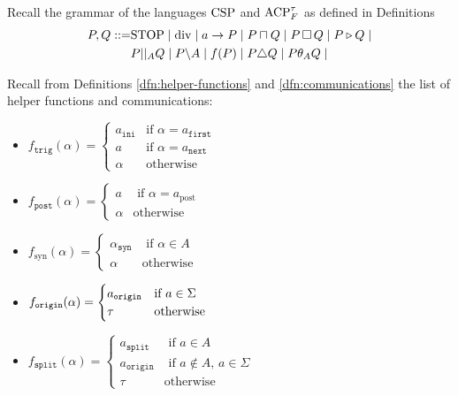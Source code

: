 \documentclass[../hons_project.tex]{subfiles}
\begin{document}
Recall the grammar of the languages $\mathrm{CSP}$ and $\mathrm{ACP}_{F}^{\tau}$ as defined in Definitions
\begin{align*}
	P, Q ::= & \mathrm{STOP} \mid \mathrm{div} \mid a\to P \mid P \sqcap Q \mid P \,\square\, Q \mid P \triangleright Q \mid \\
	         & P | |_{A} Q \mid P \backslash A \mid f(P) \mid P \triangle Q \mid P \theta_{A} Q \mid
\end{align*}

\vspace{-10pt}
Recall from Definitions \ref{dfn:helper-functions} and \ref{dfn:communications} the list of helper functions and communications:

\begin{multicols}{2}
	\begin{itemize}[leftmargin=*]
		\item $f_{\mathtt{trig}}(\alpha) = \begin{cases}
				      a_{\mathtt{ini}} & \text{if } \alpha = a_{\mathtt{first}} \\
				      a                & \text{if } \alpha = a_{\mathtt{next}}  \\
				      \alpha           & \text{otherwise}
			      \end{cases}$

		\item $f_{\mathtt{post}}(\alpha) = \begin{cases}
				      a      & \text{ if } \alpha = a_{\mathrm{post}} \\
				      \alpha & \text{otherwise}
			      \end{cases}$

		\item $f_{\mathrm{syn}}(\alpha) = \begin{cases}
				      \alpha_{\mathtt{syn}} & \text{ if } \alpha\in A \\
				      \alpha                & \text{otherwise}
			      \end{cases}$

		\item $f_{\mathtt{origin}}(\alpha) = \begin{cases}
				      a_{\mathtt{origin}} & \text{if } a\in\Sigma \\
				      \tau                & \text{otherwise}
			      \end{cases}$
		\item $f_{\mathtt{split}}(\alpha) = \begin{cases}
				      a_{\mathtt{split}}  & \text{ if } a\in A                    \\
				      a_{\mathtt{origin}} & \text{ if } a\not\in A,\, a\in \Sigma \\
				      \tau                & \mathrm{otherwise}
			      \end{cases}$
	\end{itemize}
\end{multicols}
\end{document}
